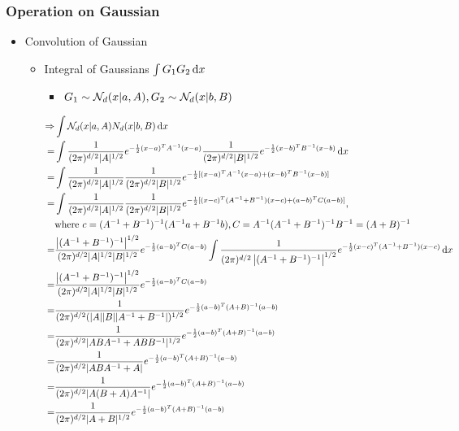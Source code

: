 \subsubsection{Operation on Gaussian}
\begin{itemize}
\item Convolution of Gaussian
	\begin{itemize}
	\item Integral of Gaussians $\int G_1G_2\mathop{}\!\mathrm{d} x$
		\begin{itemize}
		\item $G_1\sim \mathcal N_d(x|a,A), \space G_2 \sim \mathcal N_d(x|b,B)$
		\end{itemize}
		\begin{align*} \displaystyle \Rightarrow & \int \mathcal N_d(x|a,A) N_d(x|b,B)\mathop{}\!\mathrm{d} x \\ = & \int \frac 1 {(2\pi)^{d/2} |A|^{1/2}} e^{-\frac 1 2 (x-a)^TA^{-1}(x-a)} \frac 1 {(2\pi)^{d/2}|B|^{1/2}} e^{-\frac 1 2 (x-b)^TB^{-1}(x-b)} \mathop{}\!\mathrm{d} x \\ = & \int \frac 1 {(2\pi)^{d/2} |A|^{1/2}} \frac 1 {(2\pi)^{d/2}|B|^{1/2}} e^{-\frac 12 [(x-a)^TA^{-1}(x-a)+(x-b)^TB^{-1}(x-b)]} \\ = & \int \frac 1 {(2\pi)^{d/2} |A|^{1/2}} \frac 1 {(2\pi)^{d/2}|B|^{1/2}}  e^{-\frac 12 [(x-c)^T (A^{-1}+B^{-1}) (x-c)+(a-b)^TC(a-b)]},\\ & \text{where } c=(A^{-1}+B^{-1})^{-1}(A^{-1}a+B^{-1}b), C=A^{-1}(A^{-1}+B^{-1})^{-1}B^{-1} = (A+B)^{-1} \\ = & \frac {\begin{vmatrix}(A^{-1}+B^{-1})^{-1}\end{vmatrix}^{1/2}} {(2\pi)^{d/2}|A|^{1/2}|B|^{1/2}} e^{-\frac 12 (a-b)^TC(a-b)} \int \frac 1 {(2\pi)^{d/2}\begin{vmatrix}(A^{-1}+B^{-1})^{-1}\end{vmatrix}^{1/2}} e^{-\frac 12 (x-c)^T(A^{-1}+B^{-1}) (x-c)} \mathop{}\!\mathrm{d} x \\ =& \frac {\begin{vmatrix}(A^{-1}+B^{-1})^{-1}\end{vmatrix}^{1/2}} {(2\pi)^{d/2}|A|^{1/2}|B|^{1/2}} e^{-\frac 12 (a-b)^TC(a-b)} \\ =& \frac 1 {(2\pi)^{d/2} (|A||B||A^{-1}+B^{-1}|)^{1/2}} e^{-\frac 12 (a-b)^T (A+B)^{-1} (a-b)} \\=& \frac 1 {(2\pi)^{d/2} |ABA^{-1}+ABB^{-1}|^{1/2}} e^{-\frac 12 (a-b)^T (A+B)^{-1} (a-b)} \\=& \frac 1 {(2\pi)^{d/2} |ABA^{-1}+A| } e^{-\frac 12 (a-b)^T (A+B)^{-1} (a-b)} \\=& \frac 1 {(2\pi)^{d/2} |A(B+A)A^{-1}| } e^{-\frac 12 (a-b)^T (A+B)^{-1} (a-b)} \\=& \frac 1 {(2\pi)^{d/2} |A+B|^{1/2} } e^{-\frac 12 (a-b)^T (A+B)^{-1} (a-b)} \end{align*}
			

\end{itemize}
\end{itemize}
